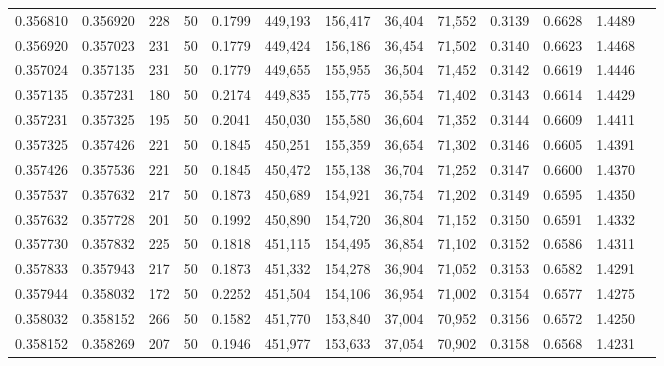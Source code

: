 \begin{tabular}{rrrrrrrrrrrrr}
0.356810 & 0.356920 &   228 &  50 &                                     0.1799 & 449,193 & 156,417 &  36,404 &  71,552 & 0.3139 & 0.6628 & 1.4489 \\
0.356920 & 0.357023 &   231 &  50 &                                     0.1779 & 449,424 & 156,186 &  36,454 &  71,502 & 0.3140 & 0.6623 & 1.4468 \\
0.357024 & 0.357135 &   231 &  50 &                                     0.1779 & 449,655 & 155,955 &  36,504 &  71,452 & 0.3142 & 0.6619 & 1.4446 \\
0.357135 & 0.357231 &   180 &  50 &                                     0.2174 & 449,835 & 155,775 &  36,554 &  71,402 & 0.3143 & 0.6614 & 1.4429 \\
0.357231 & 0.357325 &   195 &  50 &                                     0.2041 & 450,030 & 155,580 &  36,604 &  71,352 & 0.3144 & 0.6609 & 1.4411 \\
0.357325 & 0.357426 &   221 &  50 &                                     0.1845 & 450,251 & 155,359 &  36,654 &  71,302 & 0.3146 & 0.6605 & 1.4391 \\
0.357426 & 0.357536 &   221 &  50 &                                     0.1845 & 450,472 & 155,138 &  36,704 &  71,252 & 0.3147 & 0.6600 & 1.4370 \\
0.357537 & 0.357632 &   217 &  50 &                                     0.1873 & 450,689 & 154,921 &  36,754 &  71,202 & 0.3149 & 0.6595 & 1.4350 \\
0.357632 & 0.357728 &   201 &  50 &                                     0.1992 & 450,890 & 154,720 &  36,804 &  71,152 & 0.3150 & 0.6591 & 1.4332 \\
0.357730 & 0.357832 &   225 &  50 &                                     0.1818 & 451,115 & 154,495 &  36,854 &  71,102 & 0.3152 & 0.6586 & 1.4311 \\
0.357833 & 0.357943 &   217 &  50 &                                     0.1873 & 451,332 & 154,278 &  36,904 &  71,052 & 0.3153 & 0.6582 & 1.4291 \\
0.357944 & 0.358032 &   172 &  50 &                                     0.2252 & 451,504 & 154,106 &  36,954 &  71,002 & 0.3154 & 0.6577 & 1.4275 \\
0.358032 & 0.358152 &   266 &  50 &                                     0.1582 & 451,770 & 153,840 &  37,004 &  70,952 & 0.3156 & 0.6572 & 1.4250 \\
0.358152 & 0.358269 &   207 &  50 &                                     0.1946 & 451,977 & 153,633 &  37,054 &  70,902 & 0.3158 & 0.6568 & 1.4231 \\

\end{tabular}
